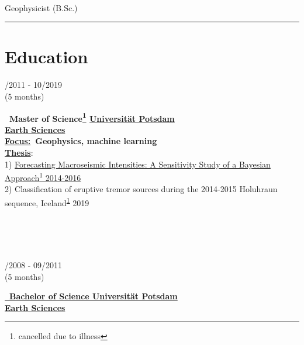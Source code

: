 \documentclass{article}
\begin{document}
\begin{minipage}[t]{0.69\textwidth}
\vspace{0pt}
	{\fontsize{30pt}{62pt}\color{gray} }\\
	{\fontsize{14pt}{24pt}\color{pblue} \selectfont Geophysicist \color{lightgray} (B.Sc.)}\\
	\hrule
	\section*{\fontsize{18pt}{24pt}\selectfont \color{pblue} Education}
	\begin{minipage}[t]{0.2\textwidth}
			/2011 - 10/2019\\(5 months)
		\end{minipage}
		\hfill
		\begin{minipage}[t]{0.75\textwidth}
		\textbf{\color{pblue}\faHourglassHalf~Master of Science\footnote{\label{1} cancelled due to illness}\hfill
		\href{https://www.uni-potsdam.de/}{\color{pblue}Universität Potsdam}} \\
		\textbf{\underline{Earth Sciences}}\\
		\textbf{\underline{Focus:}~Geophysics, machine learning}\\
		\textbf{\underline{Thesis}}:\\ 1) \href{https://github.com/silvioschwarz/master-thesis}{Forecasting Macroseismic Intensities: A Sensitivity Study of a Bayesian Approach\textsuperscript{\ref{1}} 2014-2016} \\
		2) Classification of eruptive tremor sources during the 2014-2015 Holuhraun sequence, Iceland\textsuperscript{\ref{1}} 2019
	\end{minipage}\\\\\\
	\hfill
	\begin{minipage}[t]{0.2\textwidth}
			/2008 - 09/2011\\(5 months)
		\end{minipage}
		\hfill
		\begin{minipage}[t]{0.75\textwidth}
		\textbf{\href{https://www.dropbox.com/s/297g1chiby8mrd3/Bachelor-Certificate.pdf?dl=0}{\color{pblue}\faGraduationCap~Bachelor of Science \hfill	\href{https://www.uni-potsdam.de/}{\color{pblue}Universität Potsdam}}}\\
		\textbf{\underline{Earth Sciences}}\\

\end{minipage}
\end{minipage}
\end{document}
